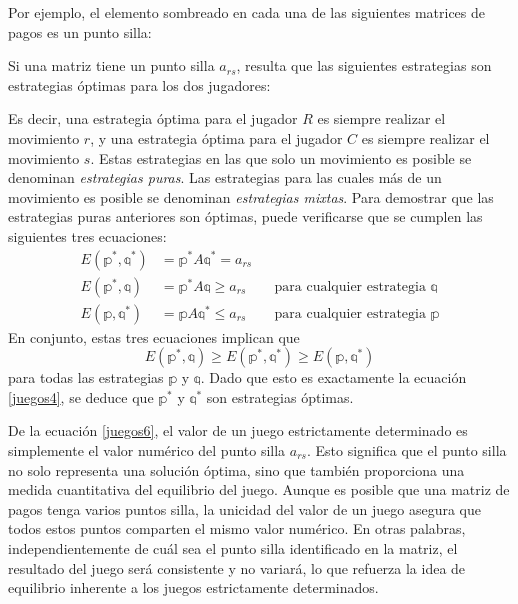 Por ejemplo, el elemento sombreado en cada una de las siguientes matrices de pagos es un punto silla:
\begin{matrizn}
\end{matrizn}
Si una matriz tiene un punto silla $a_{rs}$, resulta que las siguientes estrategias son estrategias óptimas para los dos jugadores:
\begin{nscenter}
\end{nscenter}
Es decir, una estrategia óptima para el jugador $R$ es siempre realizar el movimiento $r$, y una estrategia óptima para el jugador $C$ es siempre realizar el movimiento $s$. Estas estrategias en las que solo un movimiento es posible se denominan \emph{estrategias puras}. Las estrategias para las cuales más de un movimiento es posible se denominan \emph{estrategias mixtas}. Para demostrar que las estrategias puras anteriores son óptimas, puede verificarse que se cumplen las siguientes tres ecuaciones:
\begin{align}
    E(\mathbb{p}^*, \mathbb{q}^*) & = \mathbb{p}^* A \mathbb{q}^* = a_{rs} \label{juegos6} \\
    E(\mathbb{p}^*, \mathbb{q}) & = \mathbb{p}^* A \mathbb{q} \geq a_{rs} \qquad \text{para cualquier estrategia } \mathbb{q} \\
    E(\mathbb{p}, \mathbb{q}^*) & = \mathbb{p} A \mathbb{q}^* \leq a_{rs} \qquad \text{para cualquier estrategia } \mathbb{p}
\end{align}
En conjunto, estas tres ecuaciones implican que
$$E(\mathbb{p}^*, \mathbb{q}) \geq E(\mathbb{p}^*, \mathbb{q}^*) \geq E(\mathbb{p}, \mathbb{q}^*)$$
para todas las estrategias $\mathbb{p}$ y $\mathbb{q}$. Dado que esto es exactamente la ecuación \eqref{juegos4}, se deduce que $\mathbb{p}^*$ y $\mathbb{q}^*$ son estrategias óptimas.

De la ecuación \eqref{juegos6}, el valor de un juego estrictamente determinado es simplemente el valor numérico del punto silla $a_{rs}$. Esto significa que el punto silla no solo representa una solución óptima, sino que también proporciona una medida cuantitativa del equilibrio del juego. Aunque es posible que una matriz de pagos tenga varios puntos silla, la unicidad del valor de un juego asegura que todos estos puntos comparten el mismo valor numérico. En otras palabras, independientemente de cuál sea el punto silla identificado en la matriz, el resultado del juego será consistente y no variará, lo que refuerza la idea de equilibrio inherente a los juegos estrictamente determinados.

